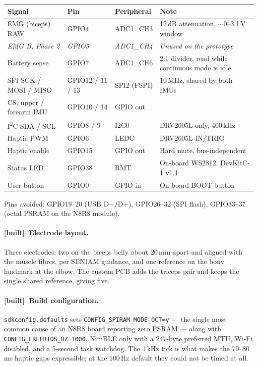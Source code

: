 \documentclass[11pt]{article}
\newcommand{\built}{{\sffamily\scriptsize\color{good}\textbf{[built]}}\ }
\begin{document}
\begin{table}[H]
\centering\small
\begin{tabularx}{\linewidth}{@{}p{33mm} p{23mm} p{19mm} X@{}}
\toprule
\textbf{Signal} & \textbf{Pin} & \textbf{Peripheral} & \textbf{Note} \\
\midrule
EMG (biceps) RAW & GPIO4 & ADC1\_CH3 & 12\,dB attenuation, $\sim$0--3.1\,V window \\
\textit{EMG B, Phase 2} & \textit{GPIO5} & \textit{ADC1\_CH4} & \textit{Unused on the prototype} \\
Battery sense & GPIO7 & ADC1\_CH6 & 2:1 divider, read while continuous mode is idle \\
SPI SCK / MOSI / MISO & GPIO12 / 11 / 13 & SPI2 (FSPI) & 10\,MHz, shared by both IMUs \\
CS, upper / forearm IMU & GPIO10 / 14 & GPIO out & \\
I\textsuperscript{2}C SDA / SCL & GPIO8 / 9 & I2C0 & DRV2605L only, 400\,kHz \\
Haptic PWM & GPIO6 & LEDC & DRV2605L IN/TRIG \\
Haptic enable & GPIO15 & GPIO out & Hard mute, bus-independent \\
Status LED & GPIO38 & RMT & On-board WS2812, DevKitC-1 v1.1 \\
User button & GPIO0 & GPIO in & On-board BOOT button \\
\bottomrule
\end{tabularx}
\end{table}

\noindent
Pins avoided: GPIO19--20 (USB D$-$/D$+$), GPIO26--32 (SPI flash), GPIO33--37
(octal PSRAM on the N8R8 module).

\paragraph{\built Electrode layout.} Three electrodes: two on the biceps
belly about 20\,mm apart and aligned with the muscle fibres, per SENIAM
guidance, and one reference on the bony landmark at the elbow. The custom PCB
adds the triceps pair and keeps the single shared reference, giving five.

\paragraph{\built Build configuration.} \texttt{sdkconfig.defaults} sets
\texttt{CONFIG\_SPIRAM\_MODE\_OCT=y} --- the single most common cause of an
N8R8 board reporting zero PSRAM --- along with
\texttt{CONFIG\_FREERTOS\_HZ=1000}, NimBLE only with a 247-byte preferred MTU,
Wi-Fi disabled, and a 5-second task watchdog. The 1\,kHz tick is what makes
the 70--80\,ms haptic gaps expressible; at the 100\,Hz default they could not
be timed at all.
\end{document}
